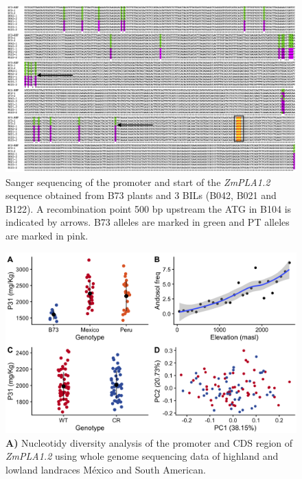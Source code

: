 \documentclass[9pt,twocolumn,twoside,lineno]{BioRxiv}
\begin{document}
\clearpage


\begin{figure}[t]
\begin{center}
\includegraphics[width=0.9 \paperwidth]{Sup_Figures/Sup_Fig_5.png}
\caption{Sanger sequencing of the promoter and start of the \textit{ZmPLA1.2} sequence obtained from B73 plants and 3 BILs (B042, B021 and B122). A recombination point 500 bp upstream the ATG in B104 is indicated by arrows. B73 alleles are marked in green and PT alleles are marked in pink. 
}
\label{SupFig4}
\end{center}
\end{figure} 

\clearpage

\begin{figure}[t]
\begin{center}
\includegraphics[width=0.4\paperwidth]{Sup_Figures/Sup_Fig_6.png}
\caption{\textbf{A)} Nucleotidy diversity analysis of the promoter and CDS region of \textit{ZmPLA1.2} using whole genome sequencing data of highland and lowland landraces México and South American.
}
\label{SupFig5}
\end{center}
\end{figure} 
\end{document}
